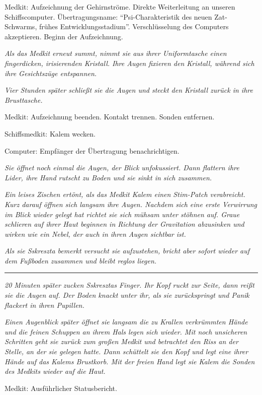 \documentclass[11pt]{scrartcl}
\begin{document}
Medkit: Aufzeichnung der Gehirnströme. Direkte Weiterleitung an unseren
Schiffscomputer. Übertragungsname: ``Psi-Charakteristik des neuen
Zat-Schwarms, frühes Entwicklungsstadium''. Verschlüsselung des
Computers akzeptieren. Beginn der Aufzeichnung.

\emph{Als das Medkit erneut summt, nimmt sie aus ihrer Uniformtasche
einen fingerdicken, irisierenden Kristall. Ihre Augen fixieren den
Kristall, während sich ihre Gesichtszüge entspannen.}

\emph{Vier Stunden später schließt sie die Augen und steckt den Kristall
zurück in ihre Brusttasche.}

Medkit: Aufzeichnung beenden. Kontakt trennen. Sonden entfernen.

Schiffsmedkit: Kalem wecken.

Computer: Empfänger der Übertragung benachrichtigen.

\emph{Sie öffnet noch einmal die Augen, der Blick unfokussiert. Dann
flattern ihre Lider, ihre Hand rutscht zu Boden und sie sinkt in sich
zusammen.}

\emph{Ein leises Zischen ertönt, als das Medkit Kalem einen Stim-Patch
verabreicht. Kurz darauf öffnen sich langsam ihre Augen. Nachdem sich
eine erste Verwirrung im Blick wieder gelegt hat richtet sie sich mühsam
unter stöhnen auf. Graue schlieren auf ihrer Haut beginnen in Richtung
der Gravitation abzusinken und wirken wie ein Nebel, der auch in ihren
Augen sichtbar ist.}

\emph{Als sie Sskreszta bemerkt versucht sie aufzustehen, bricht aber
sofort wieder auf dem Fußboden zusammen und bleibt reglos liegen.}

\begin{center}\rule{3in}{0.4pt}\end{center}

\emph{20 Minuten später zucken Sskresztas Finger. Ihr Kopf ruckt zur
Seite, dann reißt sie die Augen auf. Der Boden knackt unter ihr, als sie
zurückspringt und Panik flackert in ihren Pupillen.}

\emph{Einen Augenblick später öffnet sie langsam die zu Krallen
verkrümmten Hände und die feinen Schuppen an ihrem Hals legen sich
wieder. Mit noch unsicheren Schritten geht sie zurück zum großen Medkit
und betrachtet den Riss an der Stelle, an der sie gelegen hatte. Dann
schüttelt sie den Kopf und legt eine ihrer Hände auf das Kalems
Brustkorb. Mit der freien Hand legt sie Kalem die Sonden des Medkits
wieder auf die Haut.}

Medkit: Ausführlicher Statusbericht.
\end{document}
